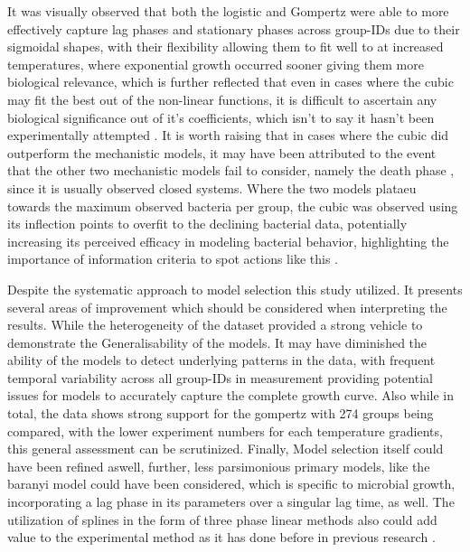 \documentclass[11pt]{article}
\begin{document}
It was visually observed that both the logistic and Gompertz were able to more effectively capture lag phases and stationary phases across group-IDs due to their sigmoidal shapes, with their flexibility allowing them to fit well to at increased temperatures, where exponential growth occurred sooner giving them more biological relevance, which is further reflected that even in cases where the cubic may fit the best out of the non-linear functions, it is difficult to ascertain any biological significance out of it's coefficients, which isn't to say it hasn't been experimentally attempted \cite{garcia2021primary}. It is worth raising that in cases where the cubic did outperform the mechanistic models, it may have been attributed to the event that the other two mechanistic models fail to consider, namely the death phase \cite{Peleg01122011}, since it is usually observed closed systems. Where the two models plataeu towards the maximum observed bacteria per group, the cubic was observed using its inflection points to overfit to the declining bacterial data, potentially increasing its perceived efficacy in modeling bacterial behavior, highlighting the importance of information criteria to spot actions like this \cite{johnson2004model}.

Despite the systematic approach to model selection this study utilized. It presents several areas of improvement which should be considered when interpreting the results. While the heterogeneity of the dataset provided a strong vehicle to demonstrate the Generalisability of the models. It may have diminished the ability of the models to detect underlying patterns in the data, with frequent temporal variability across all group-IDs in measurement providing potential issues for models to accurately capture the complete growth curve. Also while in total, the data shows strong support for the gompertz with 274 groups being compared, with the lower experiment numbers for each temperature gradients, this general assessment can be scrutinized. Finally, Model selection itself could have been refined aswell, further, less parsimonious primary models, like the baranyi model could have been considered, which is specific to microbial growth, incorporating a lag phase in its parameters over a singular lag time, as well. The utilization of splines in the form of three phase linear methods also could add value to the experimental method as it has done before in previous research \cite{buchanan1997simple}.  
\end{document}
